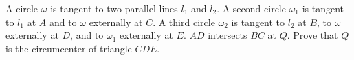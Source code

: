 A circle $\omega$ is tangent to two parallel lines $l_1$ and $l_2$. A second circle $\omega_1$ is tangent to $l_1$ at $A$ and to $\omega$ externally at $C$. A third circle $\omega_2$ is tangent to $l_2$ at $B$, to $\omega$ externally at $D$, and to $\omega_1$ externally at $E$. $AD$ intersects $BC$ at $Q$. Prove that $Q$ is the circumcenter of triangle $CDE$.
